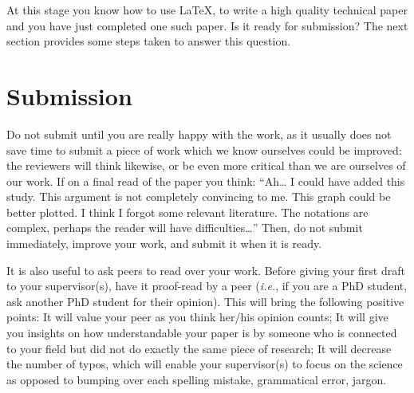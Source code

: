 \documentclass[authoryear,3p,times,preprint,review,fleqn]{elsarticle}
\newcommand{\ie}{\textit{i.e.},\xspace}
\numberwithin{equation}{section}
\theoremstyle{remark}
\begin{document}
\begin{figure}[!h]
  \begin{snippetlatex}[caption={Writing two-column papers using \LaTeX.},label={snippet_two_cols},framerule=1pt,tabsize=3]
    \usepackage{mathtools, cuted} %

    \begin{figure}[!h]
    \end{figure}

    \begin{table}[!h]
    \end{table}
   
    \begin{strip}
    \end{strip}
  \end{snippetlatex}
\end{figure}

At this stage you know how to use \LaTeX, to write a high quality technical paper and you have just completed one such paper. Is it ready for submission? The next section provides some steps taken to answer this question. 


\section{Submission}\label{sec:submission}

Do not submit until you are really happy with the work, as it usually does not save time to submit a piece of work which we know ourselves could be improved: the reviewers will think likewise, or be even more critical than we are ourselves of our work. If on a final read of the paper you think: “Ah… I could have added this study. This argument is not completely convincing to me. This graph could be better plotted. I think I forgot some relevant literature. The notations are complex, perhaps the reader will have difficulties…” Then, do not submit immediately, improve your work, and submit it when it is ready. 

It is also useful to ask peers to read over your work. Before giving your first draft to your supervisor(s), have it proof-read by a peer (\ie if you are a PhD student, ask another PhD student for their opinion). This will bring the following positive points: 
It will value your peer as you think her/his opinion counts;
It will give you insights on how understandable your paper is by someone who is connected to your field but did not do exactly the same piece of research;
It will decrease the number of typos, which will enable your supervisor(s) to focus on the science as opposed to bumping over each spelling mistake, grammatical error, jargon. 
\end{document}
